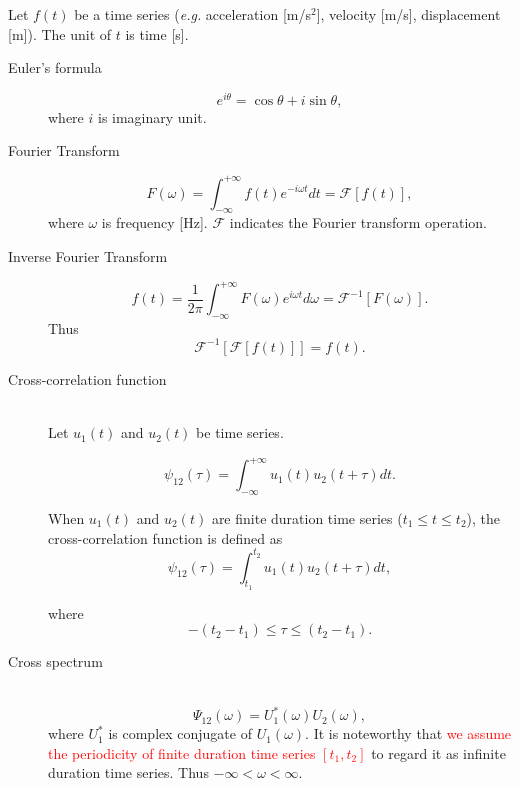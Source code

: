 \documentclass{proposal}
\begin{document}
Let $f(t)$ be a time series (\textit{e.g.} acceleration [m/s$^2$], velocity [m/s], displacement [m]). The unit of $t$ is time [s]. 
\begin{description}
\item[Euler's formula]
\begin{equation}
e^{i\theta} = \cos{\theta} + i\sin{\theta},
\end{equation}
where $i$ is imaginary unit.
\item[Fourier Transform]
\begin{equation}
F(\omega) = \int_{-\infty}^{+\infty} f(t) e^{-i\omega t} dt = \mathcal{F}[f(t)],
\end{equation}
where $\omega$ is frequency [Hz]. $\mathcal{F}$ indicates the Fourier transform operation.
\item[Inverse Fourier Transform]
\begin{equation}
f(t) = \frac{1}{2\pi} \int_{-\infty}^{+\infty} F(\omega) e^{i\omega t} d\omega = \mathcal{F}^{-1}[F(\omega)].
\end{equation}
Thus
\begin{equation}
\mathcal{F}^{-1}[\mathcal{F}[f(t)]] = f(t).
\end{equation}

\item[Cross-correlation function] ~
\\Let $u_1(t)$ and $u_2(t)$ be time series.

\begin{equation}
\psi_{12}(\tau) =  \int_{-\infty}^{+\infty} u_1(t)u_2(t+\tau) dt.
\end{equation}

When $u_1(t)$ and $u_2(t)$ are finite duration time series ($t_1 \leq t \leq t_2$), the cross-correlation function is defined as
\begin{equation}
\psi_{12}(\tau) =  \int_{t_1}^{t_2} u_1(t)u_2(t+\tau) dt,
\end{equation}

where
\begin{equation}
-(t_2 - t_1) \leq \tau \leq (t_2 - t_1). 
\end{equation}

\item[Cross spectrum] ~
\begin{equation}
\Psi_{12}(\omega) = U_1^*(\omega)U_2(\omega),
\end{equation}
where $U_1^*$ is complex conjugate of $U_1(\omega)$. It is noteworthy that \textcolor{red}{we assume the periodicity of finite duration time series $[t_1, t_2]$} to regard it as  infinite duration time series. Thus $-\infty < \omega < \infty$.
 

\end{description}
\end{document}
